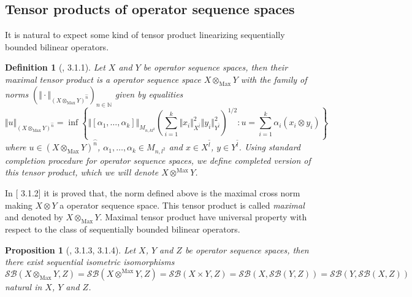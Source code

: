\documentclass[12pt]{article}
\newtheorem{proposition}[theorem]{Proposition}
\newtheorem{definition}[theorem]{Definition}
\begin{document}
\subsection{Tensor products of operator sequence spaces}

It is natural to expect some kind of tensor product linearizing sequentially bounded bilinear operators.
\begin{definition}[\cite{LamOpFolgen}, 3.1.1]\label{DefSQMaxTenProd}
Let $X$ and $Y$ be operator sequence spaces, then their maximal tensor product is a operator sequence space $X\otimes_{\mathrm{Max}}Y$ with the family of norms 
$(\Vert\cdot\Vert_{(X\otimes_{\mathrm{Max}}Y)^{\wideparen{n}}})_{n\in\mathbb{N}}$ given by equalities
$$
\Vert u\Vert_{(X\otimes_{\mathrm{Max}}Y)^{\wideparen{n}}}
=\inf\left\{\Vert[\alpha_1,\ldots,\alpha_k]\Vert_{M_{n,kl^2}}\left(\sum\limits_{i=1}^k\Vert x_i\Vert_{X^{\wideparen{l}}}^2\Vert y_i\Vert_{Y^{\wideparen{l}}}^2 \right)^{1/2}:u=\sum\limits_{i=1}^k\alpha_i(x_i\otimes y_i)\right\}
$$
where $u\in (X\otimes_{\mathrm{Max}}Y)^{\wideparen{n}}$, $\alpha_1,\ldots,\alpha_k\in M_{n,l^2}$ and $x\in X^{\wideparen{l}}$, $y\in Y^{\wideparen{l}}$. Using standard completion procedure for operator sequence spaces, we define completed version of this tensor product, which we will denote $X\otimes^{\mathrm{Max}} Y$.
\end{definition}

In [\cite{LamOpFolgen} 3.1.2] it is proved that, the norm defined above is the maximal cross norm making $X\otimes Y$ a operator sequence space. This tensor product is called \textit{maximal} and denoted by $X \otimes_{\mathrm{Max}} Y$. Maximal tensor product have universal property with respect to the class of  sequentially bounded bilinear operators.

\begin{proposition}[\cite{LamOpFolgen}, 3.1.3, 3.1.4]\label{PrSQUnivPropMaxTenProd}
Let $X$, $Y$ and $Z$ be operator sequence spaces, then there exist sequential isometric isomorphisms 
$$
\mathcal{SB}(X\otimes_{\mathrm{Max}}Y, Z)
=\mathcal{SB}(X\otimes^{\mathrm{Max}}Y, Z)
=\mathcal{SB}(X\times Y, Z)
=\mathcal{SB}(X,\mathcal{SB}(Y,Z))
=\mathcal{SB}(Y,\mathcal{SB}(X,Z))
$$
natural in $X$, $Y$ and $Z$.
\end{proposition}
\end{document}
